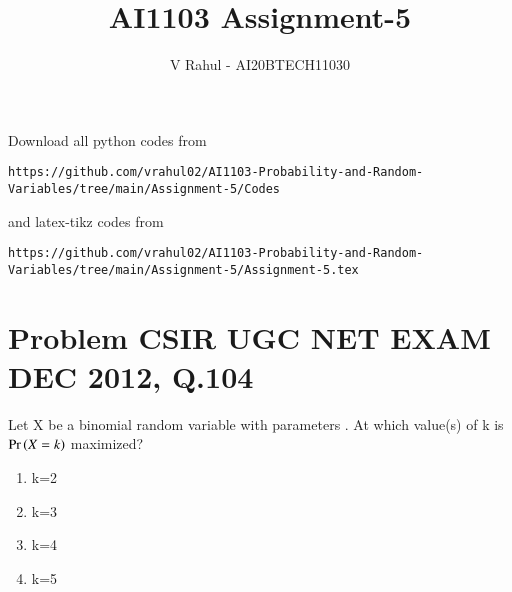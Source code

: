 \documentclass[journal,12pt,twocolumn]{IEEEtran}
\begin{document}
\title{AI1103 Assignment-5}
\author{V Rahul - AI20BTECH11030}
\maketitle
\newpage
\bigskip
\renewcommand{\thefigure}{\theenumi}
\renewcommand{\thetable}{\theenumi}
Download all python codes from 
\begin{lstlisting}
https://github.com/vrahul02/AI1103-Probability-and-Random-Variables/tree/main/Assignment-5/Codes
\end{lstlisting}
%
and latex-tikz codes from 
%
\begin{lstlisting}
https://github.com/vrahul02/AI1103-Probability-and-Random-Variables/tree/main/Assignment-5/Assignment-5.tex
\end{lstlisting}
\section*{Problem CSIR UGC NET EXAM DEC 2012, Q.104}
Let X be a binomial random variable with parameters  . At which value(s) of k is $\Pr\left(X = k\right)$ maximized?
\newline
\begin{enumerate}
\item k=2
\item k=3
\item k=4
\item k=5
\end{enumerate}
\end{document}
